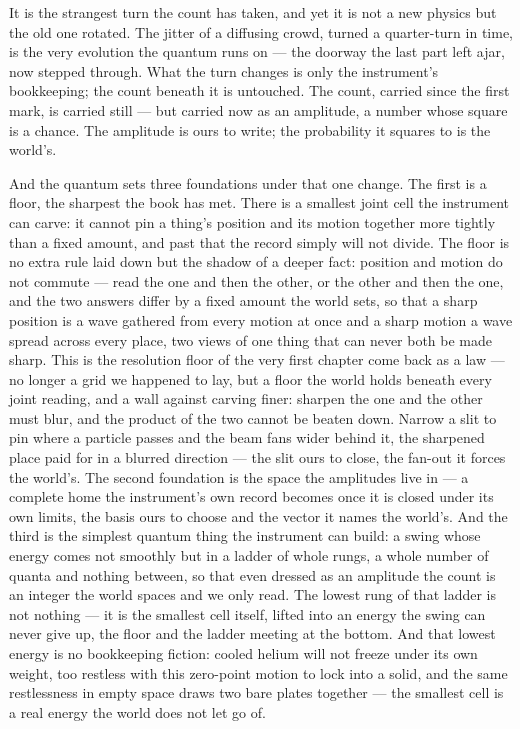 It is the strangest turn the count has taken, and yet it is not a new physics but the old one rotated. The
jitter of a diffusing crowd, turned a quarter-turn in time, is the very evolution the quantum runs on --- the
doorway the last part left ajar, now stepped through. What the turn changes is only the instrument's
bookkeeping; the count beneath it is untouched. The count, carried since the first mark, is carried still ---
but carried now as an amplitude, a number whose square is a chance. The amplitude is ours to write; the
probability it squares to is the world's.

And the quantum sets three foundations under that one change. The first is a floor, the sharpest the book has
met. There is a smallest joint cell the instrument can carve: it cannot pin a thing's position and its motion
together more tightly than a fixed amount, and past that the record simply will not divide. The floor is no
extra rule laid down but the shadow of a deeper fact: position and motion do not commute --- read the one and
then the other, or the other and then the one, and the two answers differ by a fixed amount the world sets, so
that a sharp position is a wave gathered from every motion at once and a sharp motion a wave spread across every
place, two views of one thing that can never both be made sharp. This is the resolution floor of the very first
chapter come back as a law --- no longer a grid we happened to lay, but a floor the world holds beneath every
joint reading, and a wall against carving finer: sharpen the one and the other must blur, and the product of
the two cannot be beaten down. Narrow a slit to pin where a particle passes and the beam fans wider behind it,
the sharpened place paid for in a blurred direction --- the slit ours to close, the fan-out it forces the
world's. The second foundation is the space the
amplitudes live in --- a complete home the instrument's own record becomes once it is closed under its own
limits, the basis ours to choose and the vector it names the world's. And the third is the simplest quantum
thing the instrument can build: a swing whose energy comes not smoothly but in a ladder of whole rungs, a whole
number of quanta and nothing between, so that even dressed as an amplitude the count is an integer the world
spaces and we only read. The lowest rung of that ladder is not nothing --- it is the smallest cell itself,
lifted into an energy the swing can never give up, the floor and the ladder meeting at the bottom. And that
lowest energy is no bookkeeping fiction: cooled helium will not freeze under its own weight, too restless with
this zero-point motion to lock into a solid, and the same restlessness in empty space draws two bare plates
together --- the smallest cell is a real energy the world does not let go of.

